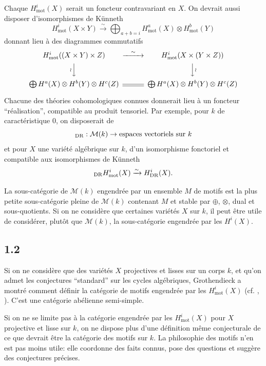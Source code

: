 \documentclass[12pt,a4paper]{article}
\theoremstyle{plain}
\theoremstyle{definition}
\theoremstyle{remark}
\newcommand{\mot}{\mathrm{mot}}
\providecommand{\mot}{\mathrm{mot}}
\providecommand{\DR}{\mathrm{DR}}
\begin{document}
Chaque $H^i_\mot(X)$ serait un foncteur contravariant en $X$. On devrait aussi disposer
d'isomorphismes de K\"unneth
\begin{equation}\label{eq:1.1.5}
H^i_\mot(X \times Y) \xrightarrow{\sim} \bigoplus_{a+b=i} H^a_\mot(X) \otimes H^b_\mot(Y)
\end{equation}
donnant lieu \`a des diagrammes commutatifs
\[
\begin{CD}
H^i_\mot((X \times Y) \times Z) @>{\sim}>> H^i_\mot(X \times (Y \times Z)) \\
@V{\wr}VV @VV{\wr}V \\
\bigoplus H^a(X) \otimes H^b(Y) \otimes H^c(Z) @= \bigoplus H^a(X) \otimes H^b(Y) \otimes H^c(Z)
\end{CD}
\]

Chacune des th\'eories cohomologiques connues donnerait lieu \`a un foncteur
``r\'ealisation'', compatible au produit tensoriel. Par exemple, pour $k$ de
caract\'eristique $0$, on disposerait de
\[
\real_{\DR}: \mathcal{M}(k) \to \text{espaces vectoriels sur } k
\]
et pour $X$ une vari\'et\'e alg\'ebrique sur $k$, d'un isomorphisme fonctoriel et
compatible aux isomorphismes de K\"unneth
\[
\real_{\DR} H^i_\mot(X) \xrightarrow{\sim} H^i_{\DR}(X).
\]

La sous-cat\'egorie de $\mathcal{M}(k)$ engendr\'ee par un ensemble $M$ de motifs est la
plus petite sous-cat\'egorie pleine de $\mathcal{M}(k)$ contenant $M$ et stable par $\oplus$,
$\otimes$, dual et sous-quotients. Si on ne consid\`ere que certaines vari\'et\'es $X$ sur
$k$, il peut \^etre utile de consid\'erer, plut\^ot que $\mathcal{M}(k)$, la sous-cat\'egorie
engendr\'ee par les $H^i(X)$.

\subsection*{1.2}

Si on ne consid\`ere que des vari\'et\'es $X$ projectives et lisses sur un corps $k$, et
qu'on admet les conjectures ``standard'' sur les cycles alg\'ebriques, Grothendieck a
montr\'e comment d\'efinir la cat\'egorie de motifs engendr\'ee par les
$H^i_\mot(X)$ (cf. \cite{Kl}, \cite{Man}). C'est une cat\'egorie ab\'elienne semi-simple.

Si on ne se limite pas \`a la cat\'egorie engendr\'ee par les $H^i_\mot(X)$ pour $X$
projective et lisse sur $k$, on ne dispose plus d'une d\'efinition m\^eme conjecturale de
ce que devrait \^etre la cat\'egorie des motifs sur $k$. La philosophie des motifs n'en est
pas moins utile: elle coordonne des faits connus, pose des questions et sugg\`ere des
conjectures pr\'ecises.
\end{document}
